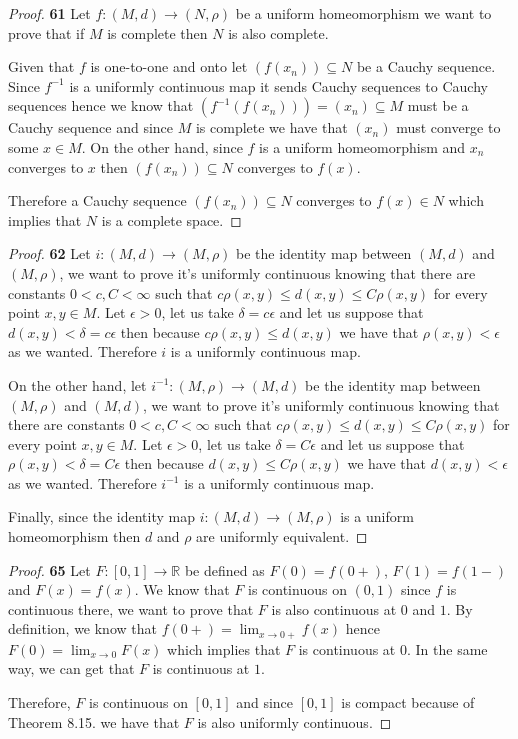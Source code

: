 \documentclass[11pt]{article}
\newcommand{\R}{\mathbb{R}}
\theoremstyle{definition}
\begin{document}
    \begin{proof}{\textbf{61}}
        Let $f:(M,d) \to (N,\rho)$ be a uniform homeomorphism we want to
        prove that if $M$ is complete then $N$ is also complete.
        
        Given that $f$ is one-to-one and onto let $(f(x_n))\subseteq N$
        be a Cauchy sequence.
        Since $f^{-1}$ is a uniformly continuous map it sends Cauchy sequences
        to Cauchy sequences hence we know that
        $(f^{-1}(f(x_n))) = (x_n) \subseteq M$ must be a Cauchy sequence and
        since $M$ is complete we have that $(x_n)$ must converge to some
        $x \in M$. On the other hand, since $f$ is a uniform homeomorphism
        and $x_n$ converges to $x$ then $(f(x_n)) \subseteq N$ converges
        to $f(x)$.

        Therefore a Cauchy sequence $(f(x_n)) \subseteq N$ converges to
        $f(x) \in N$ which implies that $N$ is a complete space.
    \end{proof}
    \begin{proof}{\textbf{62}}
        Let $i:(M,d) \to (M, \rho)$ be the identity map between $(M,d)$ and
        $(M,\rho)$, we want to prove it's uniformly continuous knowing that
        there are constants $0 < c,C < \infty$ such that
        $c\rho(x,y) \leq d(x,y) \leq C\rho(x,y)$ for every point $x,y \in M$.
        Let $\epsilon > 0$, let us take $\delta = c\epsilon$ and let us suppose 
        that $d(x,y) < \delta = c\epsilon$ then because $c\rho(x,y) \leq d(x,y)$
        we have that $\rho(x,y) < \epsilon$ as we wanted.
        Therefore $i$ is a uniformly continuous map.

        On the other hand, let $i^{-1}:(M,\rho) \to (M,d)$ be the identity map
        between $(M,\rho)$ and $(M,d)$, we want to prove it's uniformly
        continuous knowing that there are constants $0 < c,C < \infty$
        such that $c\rho(x,y) \leq d(x,y) \leq C\rho(x,y)$
        for every point $x,y \in M$.
        Let $\epsilon > 0$, let us take $\delta = C\epsilon$ and let us suppose 
        that $\rho(x,y) < \delta = C\epsilon$ then because
        $d(x,y) \leq C\rho(x,y)$ we have that $d(x,y) < \epsilon$ as we wanted.
        Therefore $i^{-1}$ is a uniformly continuous map.

        Finally, since the identity map $i:(M,d) \to (M, \rho)$ is a uniform
        homeomorphism then $d$ and $\rho$ are uniformly equivalent.
    \end{proof}
    \cleardoublepage
    \begin{proof}{\textbf{65}}
        Let $F:[0,1] \to \R$ be defined as $F(0)=f(0+)$, $F(1)=f(1-)$ and
        $F(x)=f(x)$. We know that $F$ is continuous on $(0,1)$ since $f$
        is continuous there, we want to prove that $F$ is also continuous
        at $0$ and $1$. By definition, we know that
        $f(0+) = \lim_{x\to 0+} f(x)$ hence $F(0) = \lim_{x\to 0} F(x)$
        which implies that $F$ is continuous at $0$. In the same way,
        we can get that $F$ is continuous at $1$.

        Therefore, $F$ is continuous on $[0,1]$ and since $[0,1]$ is compact
        because of Theorem 8.15. we have that $F$ is also uniformly continuous.
    \end{proof}
\end{document}
